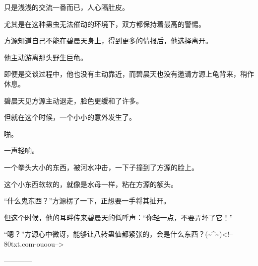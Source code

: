 \begin{this_body}
只是浅浅的交流一番而已，人心隔肚皮。

尤其是在这种蛊虫无法催动的环境下，双方都保持着最高的警惕。

方源知道自己不能在碧晨天身上，得到更多的情报后，他选择离开。

他主动游离那头野生巨龟。

即便是交谈过程中，他也没有主动靠近，而碧晨天也没有邀请方源上龟背来，稍作休息。

碧晨天见方源主动退走，脸色更缓和了许多。

但就在这个时候，一个小小的意外发生了。

啪。

一声轻响。

一个拳头大小的东西，被河水冲击，一下子撞到了方源的脸上。

这个小东西软软的，就像是水母一样，粘在方源的额头。

“什么鬼东西？”方源楞了一下，正想要一手将其扯开。

但这个时候，他的耳畔传来碧晨天的低呼声：“你轻一点，不要弄坏了它！”

“嗯？”方源心中微讶，能够让八转蛊仙都紧张的，会是什么东西？(\~{}\^{}\~{})<!--80txt.com-ouoou-->

------------

\end{this_body}


